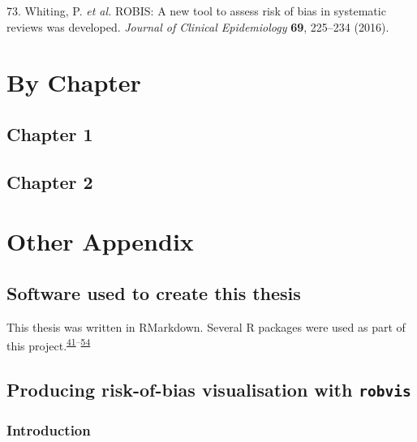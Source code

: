 \documentclass[a4paper, twoside]{templates/ociamthesis}
\begin{document}
\leavevmode\hypertarget{ref-whiting2016robis}{}%
73. Whiting, P. \emph{et al.} ROBIS: A new tool to assess risk of bias in systematic reviews was developed. \emph{Journal of Clinical Epidemiology} \textbf{69}, 225--234 (2016).

\startappendices

\hypertarget{chapter-appendix-heading}{%
\chapter{By Chapter}\label{chapter-appendix-heading}}

\hypertarget{appendix-chapter-1}{%
\section{Chapter 1}\label{appendix-chapter-1}}

\hypertarget{appendix-chapter-2}{%
\section{Chapter 2}\label{appendix-chapter-2}}

\hypertarget{other-appendix-heading}{%
\chapter{Other Appendix}\label{other-appendix-heading}}

\hypertarget{software-used-to-create-this-thesis}{%
\section{Software used to create this thesis}\label{software-used-to-create-this-thesis}}

This thesis was written in RMarkdown.
Several R packages were used as part of this project.\textsuperscript{\protect\hyperlink{ref-base}{41}--\protect\hyperlink{ref-xfun}{54}}

\hypertarget{appendix-robvis}{%
\section{\texorpdfstring{Producing risk-of-bias visualisation with \texttt{robvis}}{Producing risk-of-bias visualisation with robvis}}\label{appendix-robvis}}

\hypertarget{introduction-1}{%
\subsection{Introduction}\label{introduction-1}}
\end{document}
